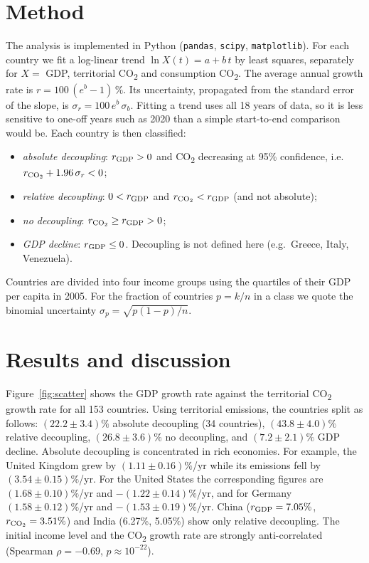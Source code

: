 \documentclass[10pt,a4paper]{article}
\newcommand{\COtwo}{CO\textsubscript{2}\xspace}
\begin{document}
\section*{Method}
The analysis is implemented in Python (\texttt{pandas}, \texttt{scipy},
\texttt{matplotlib}). For each country we fit a log-linear trend
$\ln X(t) = a + b\,t$ by least squares, separately for $X = $ GDP, territorial
\COtwo{} and consumption \COtwo{}. The average annual growth rate is
$r = 100\,(e^{b}-1)\,\%$. Its uncertainty, propagated from the standard error
of the slope, is $\sigma_r = 100\,e^{b}\,\sigma_b$. Fitting a trend uses all 18
years of data, so it is less sensitive to one-off years such as 2020 than a
simple start-to-end comparison would be. Each country is then classified:
\begin{itemize}\setlength\itemsep{0em}
  \item \emph{absolute decoupling}: $r_{\rm GDP} > 0$ and \COtwo{} decreasing at 95\% confidence, i.e.\ $r_{\rm CO_2} + 1.96\,\sigma_{r} < 0$;
  \item \emph{relative decoupling}: $0 < r_{\rm GDP}$ and $r_{\rm CO_2} < r_{\rm GDP}$ (and not absolute);
  \item \emph{no decoupling}: $r_{\rm CO_2} \geq r_{\rm GDP} > 0$;
  \item \emph{GDP decline}: $r_{\rm GDP} \leq 0$. Decoupling is not defined here (e.g.\ Greece, Italy, Venezuela).
\end{itemize}
Countries are divided into four income groups using the quartiles of their GDP
per capita in 2005. For the fraction of countries $p = k/n$ in a class we
quote the binomial uncertainty $\sigma_p = \sqrt{p(1-p)/n}$.

\section*{Results and discussion}
Figure~\ref{fig:scatter} shows the GDP growth rate against the territorial
\COtwo{} growth rate for all 153 countries. Using territorial emissions, the
countries split as follows:
$(22.2 \pm 3.4)\%$ absolute decoupling (34 countries),
$(43.8 \pm 4.0)\%$ relative decoupling,
$(26.8 \pm 3.6)\%$ no decoupling, and $(7.2\pm2.1)\%$ GDP decline.
Absolute decoupling is concentrated in rich economies. For example, the United
Kingdom grew by $(1.11\pm0.16)\%$/yr while its emissions fell by
$(3.54\pm0.15)\%$/yr. For the United States the corresponding figures are
$(1.68\pm0.10)\%$/yr and $-(1.22\pm0.14)\%$/yr, and for Germany
$(1.58\pm0.12)\%$/yr and $-(1.53\pm0.19)\%$/yr. China
($r_{\rm GDP}=7.05\%$, $r_{\rm CO_2}=3.51\%$) and India (6.27\%, 5.05\%) show
only relative decoupling. The initial income level and the \COtwo{} growth rate
are strongly anti-correlated (Spearman $\rho = -0.69$, $p \approx 10^{-22}$).
\end{document}

